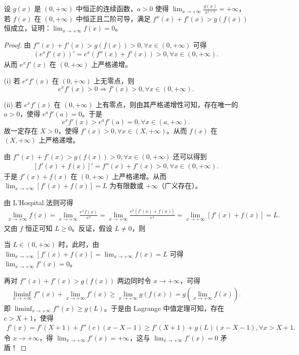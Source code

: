 \documentclass[../../main.tex]{subfiles}
\begin{document}
\vspace{0.5cm}

\begin{example}
设 \( g(x) \) 是 \( (0,+\infty) \) 中恒正的连续函数，\( a>0 \) 使得 \( \lim_{x \to +\infty} \frac{g(x)}{x^{1 + a}} = +\infty \)，若 \( f(x) \) 在 \( (0,+\infty) \) 中恒正且二阶可导，满足 \( f''(x) + f'(x) > g(f(x)) \) 恒成立，证明：\( \lim_{x \to +\infty} f(x) = 0 \)。
\end{example}
\begin{proof}
由 \( f''(x) + f'(x) > g(f(x)) > 0, \forall x \in (0,+\infty) \) 可得
\begin{align*}
\left( e^x f'(x) \right)' = e^x \left( f''(x) + f'(x) \right) > 0, \forall x \in (0,+\infty).
\end{align*}
从而 \( e^x f'(x) \) 在 \( (0,+\infty) \) 上严格递增。

(i) 若 \( e^x f'(x) \) 在 \( (0,+\infty) \) 上无零点，则
\[
e^x f'(x) > 0 \Rightarrow f'(x) > 0, \forall x \in (0,+\infty).
\]

(ii) 若 \( e^x f'(x) \) 在 \( (0,+\infty) \) 上有零点，则由其严格递增性可知，存在唯一的 \( a > 0 \)，使得 \( e^a f'(a) = 0 \)。于是
\[
e^x f'(x) > e^a f'(a) = 0, \forall x \in (a,+\infty).
\]
故一定存在 \( X > 0 \)，使得 \( f'(x) > 0, \forall x \in (X,+\infty) \)。从而 \( f(x) \) 在 \( (X,+\infty) \) 上严格递增。

由 \( f''(x) + f'(x) > g(f(x)) > 0, \forall x \in (0,+\infty) \) 还可以得到
\begin{align*}
\left[ f'(x) + f(x) \right]' = f''(x) + f'(x) > 0, \forall x \in (0,+\infty).
\end{align*}
于是 \( f'(x) + f(x) \) 在 \( (0,+\infty) \) 上严格递增。从而 \( \lim_{x \to +\infty} \left[ f'(x) + f(x) \right] = L \) 为有限数或 \( +\infty \)（广义存在）。

由 L'Hospital 法则可得
\begin{align*}
\lim_{x \to +\infty} f(x) = \lim_{x \to +\infty} \frac{e^x f(x)}{e^x} = \lim_{x \to +\infty} \frac{e^x \left[ f'(x) + f(x) \right]}{e^x} = \lim_{x \to +\infty} \left[ f'(x) + f(x) \right] = L.
\end{align*}
又由 \( f \) 恒正可知 \( L \geq 0 \)。反证，假设 \( L \neq 0 \)，则

\one 当 \( L \in (0,+\infty) \) 时，此时，由 \( \lim_{x \to +\infty} \left[ f'(x) + f(x) \right] = \lim_{x \to +\infty} f(x) = L \) 可得 \( \lim_{x \to +\infty} f'(x) = 0 \)。

再对 \( f''(x) + f'(x) > g(f(x)) \) 两边同时令 \( x \to +\infty \)，可得
\begin{align*}
\liminf_{x \to +\infty} f''(x) + \lim_{x \to +\infty} f'(x) \geq \lim_{x \to +\infty} g(f(x)) = g\left( \lim_{x \to +\infty} f(x) \right).
\end{align*}
即 \( \liminf_{x \to +\infty} f''(x) \geq g(L) \)。于是由 Lagrange 中值定理可知，存在 \( c > X + 1 \)，使得
\begin{align*}
f'(x) = f'(X + 1) + f''(c) (x - X - 1) \geq f'(X + 1) + g(L) (x - X - 1), \forall x > X + 1.
\end{align*}
令 \( x \to +\infty \)，得 \( \lim_{x \to +\infty} f'(x) = +\infty \)，这与 \( \lim_{x \to +\infty} f'(x) = 0 \) 矛盾！


\end{proof}
\end{document}
